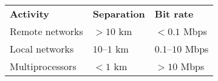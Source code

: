 
\vspace{-5pt} 
\begin{table}[ht]
\centering \tiny  %
\begin{tabular}{l l l}
\hline
\textbf{Activity} & \textbf{Separation} & \textbf{Bit rate} \\
Remote networks   & $> 10$ km  & $< 0.1$ Mbps  \\
Local networks    & $10\text{--}1$ km & $0.1\text{--}10$ Mbps \\
Multiprocessors   & $< 1$ km   & $> 10$ Mbps   \\
\hline
\end{tabular}
\label{tab:network_comparison}
\end{table}
\vspace{-8pt} 